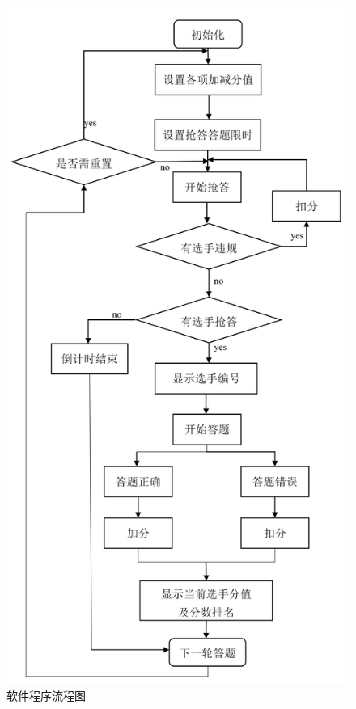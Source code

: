 \documentclass[12pt]{article}
\begin{document}
\begin{figure}[h]
	\centering
	\includegraphics[width=0.7\linewidth]{picture/02.jpg}
	\caption{软件程序流程图}
	\label{fig:kuangtu2}
\end{figure}
\end{document}
